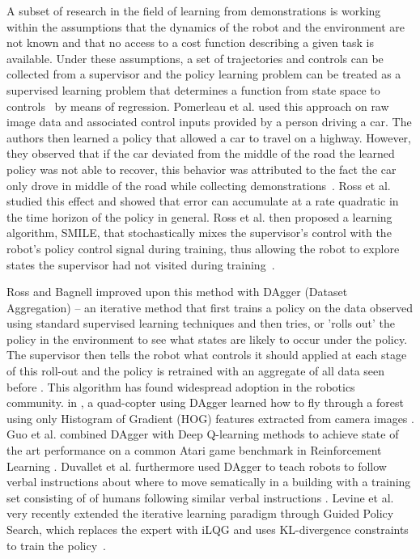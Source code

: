 \documentclass[10pt, conference]{ieeeconf}      %
\begin{document}
A subset of research in the field of learning from demonstrations is working within the assumptions that the dynamics of
the robot and the environment are not known and that no access to a cost function describing a given task is available.
Under these assumptions, a set of trajectories and controls can be collected from a supervisor and the policy learning
problem can be treated as a supervised learning problem that determines a function from state space to
controls~\cite{argall2009survey} by means of regression. Pomerleau et al. used this approach on raw image data and
associated control inputs provided by a person driving a car. The authors then learned a policy that allowed a car to
travel on a highway. However, they observed that if the car deviated from the middle of the road the learned policy was
not able to recover, this behavior was attributed to the fact the car only drove in middle of the road while collecting
demonstrations~\cite{pomerleau1989alvinn}. Ross et al. studied this effect and showed that error can accumulate at a
rate quadratic in the time horizon of the policy in general. Ross et al. then proposed a learning algorithm, SMILE, that
stochastically mixes the supervisor's control with the robot's policy control signal during training, thus allowing the
robot to explore states the supervisor had not visited during training~\cite{ross2010efficient}. 

Ross and Bagnell improved upon this method with DAgger (Dataset Aggregation) -- an iterative method that first trains a
policy on the data observed using standard supervised learning techniques and then tries, or 'rolls out' the policy in
the environment to see what states are likely to occur under the policy. The supervisor then tells the robot what
controls it should applied at each stage of this roll-out and the policy is retrained with an aggregate of all data seen
before \cite{ross2010reduction}. This algorithm has found widespread adoption in the robotics community. in
\cite{ross2013learning}, a quad-copter using DAgger learned how to fly through a forest using only Histogram of Gradient
(HOG) features extracted from camera images \cite{ross2013learning}. Guo et al. combined DAgger with Deep Q-learning
methods to achieve state of the art performance on a common Atari game benchmark in Reinforcement Learning
\cite{NIPS2014_5421}. Duvallet et al. furthermore used DAgger to teach robots to follow verbal instructions about where
to move sematically in a building with a training set consisting of of humans following similar verbal instructions
\cite{duvallet2013imitation}. Levine et al. very recently extended the iterative learning paradigm through Guided Policy
Search, which replaces the expert with iLQG and uses KL-divergence constraints to train the policy~\cite{levine2015end}.  
\end{document}
